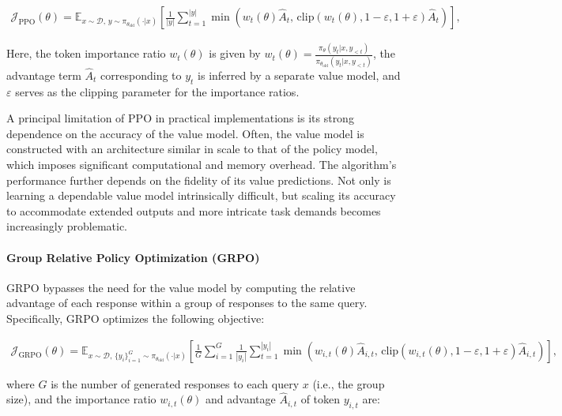 \begin{align}
\mathcal{J}_\text{PPO}(\theta) = \mathbb{E}_{ x \sim \mathcal{D},\, y \sim \pi_{\theta_\text{old}}( \cdot | x) }
\left[ \frac{1}{|y|} \sum_{t=1}^{|y|} 
\min \left( w_{t}(\theta) \widehat{A}_{t},  \, \mathrm{clip} \left( w_{t}(\theta), 1 - {\varepsilon}, 1 + {\varepsilon}\right) \widehat{A}_{t} \right)
\right],
\end{align}

Here, the token importance ratio $w_{t}(\theta)$ is given by $
w_{t}(\theta) = \frac{ \pi_{\theta} (y_{t} | x, y_{<t}) }{ \pi_{\theta_\text{old}} (y_{t} | x,y_{<t})} $, the advantage term $\widehat{A}_{t}$ corresponding to $y_t$ is inferred by a separate value model, and $\varepsilon$ serves as the clipping parameter for the importance ratios.

A principal limitation of PPO in practical implementations is its strong dependence on the accuracy of the value model. Often, the value model is constructed with an architecture similar in scale to that of the policy model, which imposes significant computational and memory overhead. The algorithm’s performance further depends on the fidelity of its value predictions. Not only is learning a dependable value model intrinsically difficult, but scaling its accuracy to accommodate extended outputs and more intricate task demands becomes increasingly problematic.

\paragraph{Group Relative Policy Optimization (GRPO)} GRPO \citep{grpo} bypasses the need for the value model by computing the relative advantage of each response within a group of responses to the same query. Specifically, GRPO optimizes the following objective:

\begin{align}
\label{equ:grpo}
\mathcal{J}_\text{GRPO}(\theta) = \mathbb{E}_{ x \sim \mathcal{D},\, \{y_i\}_{i=1}^G \sim \pi_{\theta_\text{old}}( \cdot | x) }
\left[ \frac{1}{G} \sum_{i=1}^{G} \frac{1}{|y_i|} \sum_{t=1}^{|y_i|} 
\min \left( w_{i,t}(\theta) \widehat{A}_{i,t},  \, \mathrm{clip} \left( w_{i,t}(\theta), 1 - {\varepsilon}, 1 + {\varepsilon}\right) \widehat{A}_{i,t} \right)
\right],
\end{align}

where $G$ is the number of generated responses to each query $x$ (i.e., the group size), and the importance ratio $w_{i,t}(\theta)$ and advantage $\widehat{A}_{i,t}$ of token $y_{i,t}$ are:

